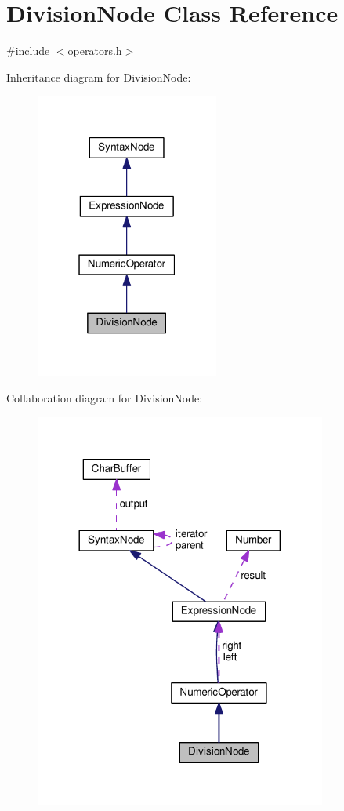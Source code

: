 \hypertarget{classDivisionNode}{}\section{Division\+Node Class Reference}
\label{classDivisionNode}


{\ttfamily \#include $<$operators.\+h$>$}



Inheritance diagram for Division\+Node\+:
\nopagebreak
\begin{figure}[H]
\begin{center}
\leavevmode
\includegraphics[width=171pt]{db/d42/classDivisionNode__inherit__graph}
\end{center}
\end{figure}


Collaboration diagram for Division\+Node\+:
\nopagebreak
\begin{figure}[H]
\begin{center}
\leavevmode
\includegraphics[width=272pt]{da/d33/classDivisionNode__coll__graph}
\end{center}
\end{figure}
